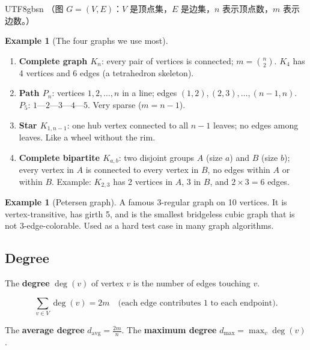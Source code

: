 \documentclass[12pt]{article}
\theoremstyle{definition}
\newtheorem{example}[theorem]{Example}
\theoremstyle{remark}
\begin{document}
\begin{CJK}{UTF8}{gbsn}
（图 $G=(V,E)$：$V$ 是顶点集，$E$ 是边集，$n$ 表示顶点数，$m$ 表示边数。）
\end{CJK}

\begin{example}[The four graphs we use most]
\leavevmode
\begin{enumerate}
  \item \textbf{Complete graph $K_n$}:
        every pair of vertices is connected; $m = \binom{n}{2}$.
        $K_4$ has 4 vertices and 6 edges (a tetrahedron skeleton).

  \item \textbf{Path $P_n$}:
        vertices $1,2,\ldots,n$ in a line; edges $(1,2),(2,3),\ldots,(n{-}1,n)$.
        $P_5$: \quad $1$---$2$---$3$---$4$---$5$.  Very sparse ($m = n-1$).

  \item \textbf{Star $K_{1,n-1}$}:
        one hub vertex connected to all $n-1$ leaves; no edges among leaves.
        Like a wheel without the rim.

  \item \textbf{Complete bipartite $K_{a,b}$}:
        two disjoint groups $A$ (size $a$) and $B$ (size $b$);
        every vertex in $A$ is connected to every vertex in $B$,
        no edges within $A$ or within $B$.  Example: $K_{2,3}$ has 2 vertices
        in $A$, 3 in $B$, and $2\times 3 = 6$ edges.
\end{enumerate}
\end{example}

\begin{example}[Petersen graph]
A famous 3-regular graph on 10 vertices.  It is vertex-transitive, has girth 5,
and is the smallest bridgeless cubic graph that is not 3-edge-colorable.
Used as a hard test case in many graph algorithms.
\end{example}

\subsection{Degree}

The \textbf{degree} $\deg(v)$ of vertex $v$ is the number of edges touching $v$.

\[
  \sum_{v \in V} \deg(v) = 2m
  \quad\text{(each edge contributes 1 to each endpoint)}.
\]

The \textbf{average degree} $d_{\mathrm{avg}} = \frac{2m}{n}$.
The \textbf{maximum degree} $d_{\max} = \max_v \deg(v)$.
\end{document}
